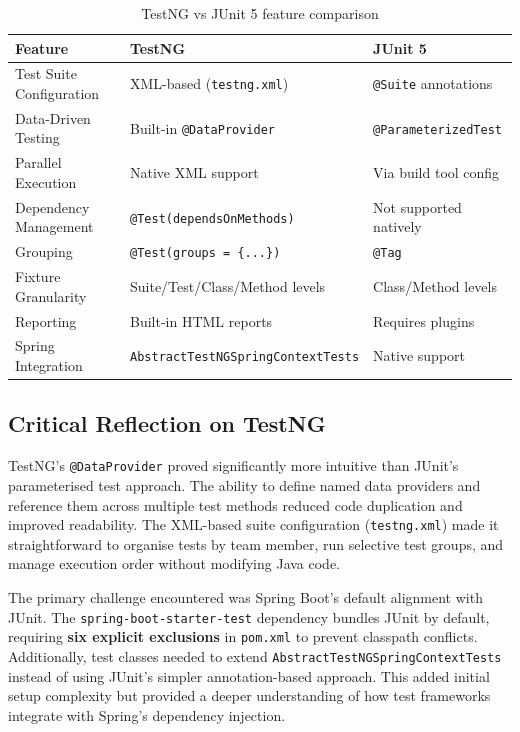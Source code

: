 \documentclass[12pt,a4paper]{article}
\begin{document}
\begin{table}[H]
\centering
\begin{tabular}{lll}
    \toprule
    \textbf{Feature} & \textbf{TestNG} & \textbf{JUnit 5} \\
    \midrule
    Test Suite Configuration & XML-based (\texttt{testng.xml}) & \texttt{@Suite} annotations \\
    Data-Driven Testing & Built-in \texttt{@DataProvider} & \texttt{@ParameterizedTest} \\
    Parallel Execution & Native XML support & Via build tool config \\
    Dependency Management & \texttt{@Test(dependsOnMethods)} & Not supported natively \\
    Grouping & \texttt{@Test(groups = \{...\})} & \texttt{@Tag} \\
    Fixture Granularity & Suite/Test/Class/Method levels & Class/Method levels \\
    Reporting & Built-in HTML reports & Requires plugins \\
    Spring Integration & \texttt{AbstractTestNGSpringContextTests} & Native support \\
    \bottomrule
\end{tabular}
\caption{TestNG vs JUnit 5 feature comparison}
\end{table}

\subsection{Critical Reflection on TestNG}

\begin{tcolorbox}[insightbox, title=Insight: TestNG's Strengths]
TestNG's \texttt{@DataProvider} proved significantly more intuitive than JUnit's parameterised test approach. The ability to define named data providers and reference them across multiple test methods reduced code duplication and improved readability. The XML-based suite configuration (\texttt{testng.xml}) made it straightforward to organise tests by team member, run selective test groups, and manage execution order without modifying Java code.
\end{tcolorbox}

\begin{tcolorbox}[warnbox, title=Challenge: Ecosystem Compatibility]
The primary challenge encountered was Spring Boot's default alignment with JUnit. The \texttt{spring-boot-starter-test} dependency bundles JUnit by default, requiring \textbf{six explicit exclusions} in \texttt{pom.xml} to prevent classpath conflicts. Additionally, test classes needed to extend \texttt{AbstractTestNGSpringContextTests} instead of using JUnit's simpler annotation-based approach. This added initial setup complexity but provided a deeper understanding of how test frameworks integrate with Spring's dependency injection.
\end{tcolorbox}
\end{document}
